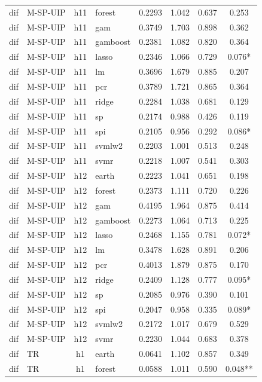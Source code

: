 \begin{ThreePartTable}
\begin{longtable}[t]{llclcccc}
dif & M-SP-UIP & h11 & forest & 0.2293 & 1.042 & 0.637 & 0.253\\
dif & M-SP-UIP & h11 & gam & 0.3749 & 1.703 & 0.898 & 0.362\\
dif & M-SP-UIP & h11 & gamboost & 0.2381 & 1.082 & 0.820 & 0.364\\
dif & M-SP-UIP & h11 & lasso & 0.2346 & 1.066 & 0.729 & 0.076*\\
dif & M-SP-UIP & h11 & lm & 0.3696 & 1.679 & 0.885 & 0.207\\
dif & M-SP-UIP & h11 & pcr & 0.3789 & 1.721 & 0.865 & 0.364\\
dif & M-SP-UIP & h11 & ridge & 0.2284 & 1.038 & 0.681 & 0.129\\
dif & M-SP-UIP & h11 & sp & 0.2174 & 0.988 & 0.426 & 0.119\\
dif & M-SP-UIP & h11 & spi & 0.2105 & 0.956 & 0.292 & 0.086*\\
dif & M-SP-UIP & h11 & svmlw2 & 0.2203 & 1.001 & 0.513 & 0.248\\
dif & M-SP-UIP & h11 & svmr & 0.2218 & 1.007 & 0.541 & 0.303\\
\addlinespace
dif & M-SP-UIP & h12 & earth & 0.2223 & 1.041 & 0.651 & 0.198\\
dif & M-SP-UIP & h12 & forest & 0.2373 & 1.111 & 0.720 & 0.226\\
dif & M-SP-UIP & h12 & gam & 0.4195 & 1.964 & 0.875 & 0.414\\
dif & M-SP-UIP & h12 & gamboost & 0.2273 & 1.064 & 0.713 & 0.225\\
dif & M-SP-UIP & h12 & lasso & 0.2468 & 1.155 & 0.781 & 0.072*\\
dif & M-SP-UIP & h12 & lm & 0.3478 & 1.628 & 0.891 & 0.206\\
dif & M-SP-UIP & h12 & pcr & 0.4013 & 1.879 & 0.875 & 0.170\\
dif & M-SP-UIP & h12 & ridge & 0.2409 & 1.128 & 0.777 & 0.095*\\
dif & M-SP-UIP & h12 & sp & 0.2085 & 0.976 & 0.390 & 0.101\\
dif & M-SP-UIP & h12 & spi & 0.2047 & 0.958 & 0.335 & 0.089*\\
dif & M-SP-UIP & h12 & svmlw2 & 0.2172 & 1.017 & 0.679 & 0.529\\
dif & M-SP-UIP & h12 & svmr & 0.2230 & 1.044 & 0.683 & 0.378\\
\addlinespace
dif & TR & h1 & earth & 0.0641 & 1.102 & 0.857 & 0.349\\
dif & TR & h1 & forest & 0.0588 & 1.011 & 0.590 & 0.048**\\

\end{longtable}
\end{ThreePartTable}
